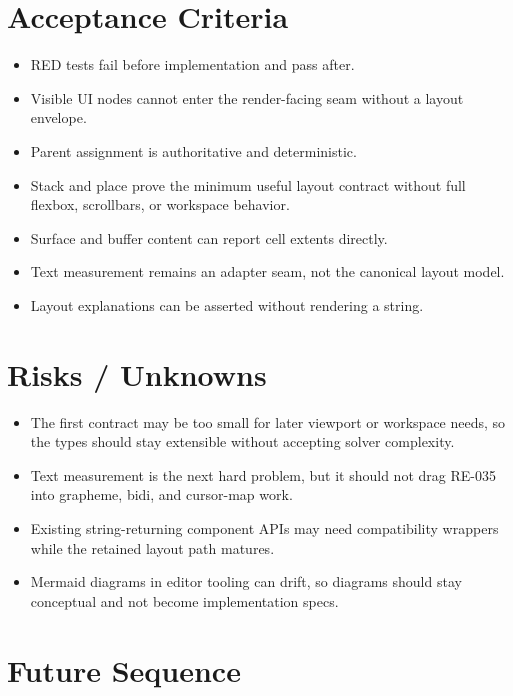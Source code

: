\section{Acceptance Criteria}\label{record-163-acceptance-criteria}

\begin{itemize}
\tightlist
\item
  RED tests fail before implementation and pass after.
\item
  Visible UI nodes cannot enter the render-facing seam without a layout envelope.
\item
  Parent assignment is authoritative and deterministic.
\item
  Stack and place prove the minimum useful layout contract without full flexbox, scrollbars, or workspace behavior.
\item
  Surface and buffer content can report cell extents directly.
\item
  Text measurement remains an adapter seam, not the canonical layout model.
\item
  Layout explanations can be asserted without rendering a string.
\end{itemize}

\section{Risks / Unknowns}\label{record-163-risks-unknowns}

\begin{itemize}
\tightlist
\item
  The first contract may be too small for later viewport or workspace needs, so the types should stay extensible without accepting solver complexity.
\item
  Text measurement is the next hard problem, but it should not drag RE-035 into grapheme, bidi, and cursor-map work.
\item
  Existing string-returning component APIs may need compatibility wrappers while the retained layout path matures.
\item
  Mermaid diagrams in editor tooling can drift, so diagrams should stay conceptual and not become implementation specs.
\end{itemize}

\section{Future Sequence}\label{record-163-future-sequence}

